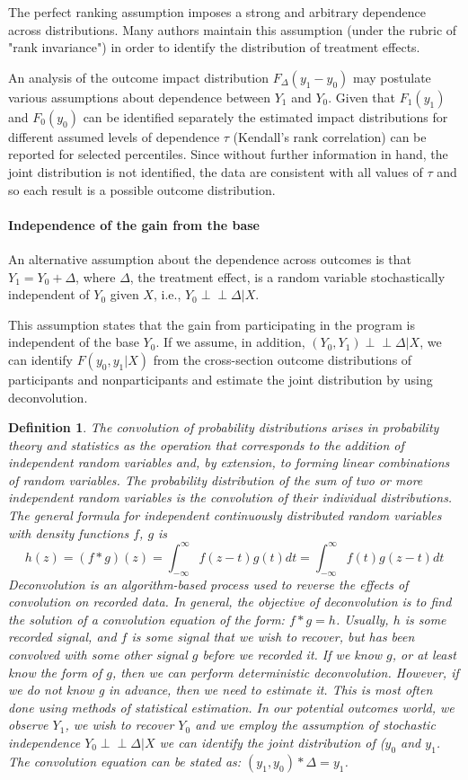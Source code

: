 \documentclass[12pt]{article}
\newcommand{\indep}{\perp \!\!\! \perp}
\theoremstyle{definition}
\newtheorem{definition}{Definition}[section]
\begin{document}
The perfect ranking assumption imposes a strong and arbitrary dependence across distributions. Many authors maintain this assumption (under the rubric of "rank invariance") in order to identify the distribution of treatment effects.

An analysis of the outcome impact distribution $F_{\Delta}(y_1 - y_0)$ may postulate various assumptions about dependence between $Y_1$ and $Y_0$. Given that $F_1(y_1)$ and $F_0(y_0)$ can be identified separately the estimated impact distributions for different assumed levels of dependence $\tau$ (Kendall's rank correlation) can be reported for selected percentiles. Since without further information in hand, the joint distribution is not identified, the data are consistent with all values of $\tau$ and so each result is a possible outcome distribution.

\paragraph{Independence of the gain from the base}
An alternative assumption about the dependence across outcomes is that $Y_1 = Y_0 + \Delta$, where $\Delta$, the treatment effect, is a random variable stochastically independent of $Y_0$ given $X$, i.e., $Y_0 \indep \Delta | X$. 

This assumption states that the gain from participating in the program is independent of the base $Y_0$. If we assume, in addition, $(Y_0,Y_1)\indep \Delta | X$, we can identify $F(y_0, y_1 | X)$ from the cross-section outcome distributions of participants and nonparticipants and estimate the joint distribution by using deconvolution.

\begin{definition}  \textit {The convolution of probability distributions arises in probability theory and statistics as the operation that corresponds to the addition of independent random variables and, by extension, to forming linear combinations of random variables. The probability distribution of the sum of two or more independent random variables is the convolution of their individual distributions. The general formula for independent continuously distributed random variables with density functions $f$, $g$ is 
$$h(z) = (f*g)(z) = \int_{-\infty}^{\infty} f(z-t)g(t)dt = \int _{-\infty}^{\infty} f(t)g(z-t)dt$$ Deconvolution is an algorithm-based process used to reverse the effects of convolution on recorded data. In general, the objective of deconvolution is to find the solution of a convolution equation of the form: $f*g = h$. Usually, $h$ is some recorded signal, and $f$ is some signal that we wish to recover, but has been convolved with some other signal $g$ before we recorded it. If we know $g$, or at least know the form of $g$, then we can perform deterministic deconvolution. However, if we do not know g in advance, then we need to estimate it. This is most often done using methods of statistical estimation. In our potential outcomes world, we observe $Y_1$, we wish to recover $Y_0$ and we employ the assumption of stochastic independence $Y_0 \indep \Delta | X$ we can identify the joint distribution of ($y_0$ and $y_1$. The convolution equation can be stated as: $(y_1, y_0)*\Delta = y_1$.}
\end{definition}
\end{document}

